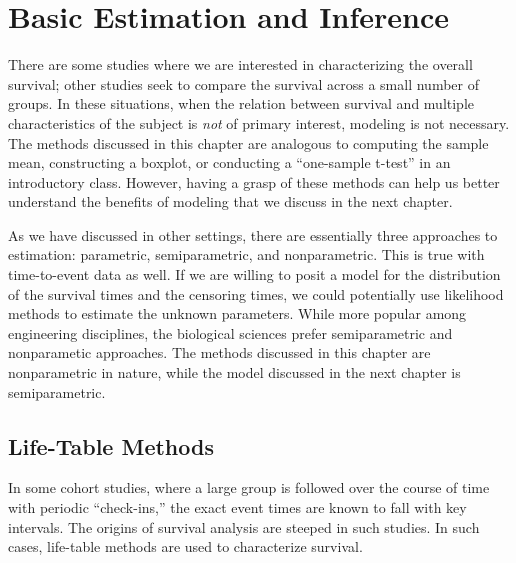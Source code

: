 \documentclass[
  letterpaper,
  DIV=11,
  numbers=noendperiod]{scrreprt}
\theoremstyle{definition}
\theoremstyle{definition}
\theoremstyle{remark}
\begin{document}
\hypertarget{sec-surv-basic}{%
\chapter{Basic Estimation and Inference}\label{sec-surv-basic}}

\providecommand{\norm}[1]{\left\lVert#1\right\rVert}
\providecommand{\abs}[1]{\left\lvert#1\right\rvert}
\providecommand{\dist}[1]{\stackrel{\text{#1}}{\sim}}
\providecommand{\ind}[1]{\mathbb{I}\left(#1\right)}
\providecommand{\bm}[1]{\mathbf{#1}}
\providecommand{\bs}[1]{\boldsymbol{#1}}
\providecommand{\Ell}{\mathcal{L}}
\providecommand{\indep}{\perp\negthickspace\negmedspace\perp}

There are some studies where we are interested in characterizing the
overall survival; other studies seek to compare the survival across a
small number of groups. In these situations, when the relation between
survival and multiple characteristics of the subject is \emph{not} of
primary interest, modeling is not necessary. The methods discussed in
this chapter are analogous to computing the sample mean, constructing a
boxplot, or conducting a ``one-sample t-test'' in an introductory class.
However, having a grasp of these methods can help us better understand
the benefits of modeling that we discuss in the next chapter.

As we have discussed in other settings, there are essentially three
approaches to estimation: parametric, semiparametric, and nonparametric.
This is true with time-to-event data as well. If we are willing to posit
a model for the distribution of the survival times and the censoring
times, we could potentially use likelihood methods to estimate the
unknown parameters. While more popular among engineering disciplines,
the biological sciences prefer semiparametric and nonparametic
approaches. The methods discussed in this chapter are nonparametric in
nature, while the model discussed in the next chapter is semiparametric.

\hypertarget{life-table-methods}{%
\section{Life-Table Methods}\label{life-table-methods}}

In some cohort studies, where a large group is followed over the course
of time with periodic ``check-ins,'' the exact event times are known to
fall with key intervals. The origins of survival analysis are steeped in
such studies. In such cases, life-table methods are used to characterize
survival.
\end{document}
